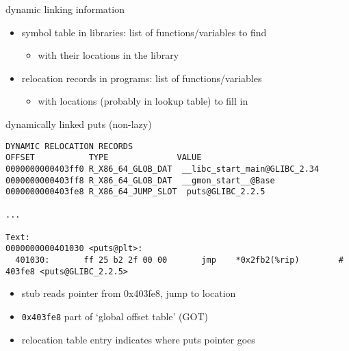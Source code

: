 \begin{frame}{dynamic linking information}
\begin{itemize}
\item symbol table in libraries: list of functions/variables to find
    \begin{itemize}
    \item with their locations in the library
    \end{itemize}
\item relocation records in programs: list of functions/variables
    \begin{itemize}
    \item with locations (probably in lookup table) to fill in
    \end{itemize}
\end{itemize}
\end{frame}


\begin{frame}[fragile,label=dynamicPuts]{dynamically linked puts (non-lazy)}
\begin{Verbatim}[commandchars=Q\{\},fontsize=\fontsize{9}{10}\selectfont]
DYNAMIC RELOCATION RECORDS
OFFSET           TYPE              VALUE 
0000000000403ff0 R_X86_64_GLOB_DAT  __libc_start_main@GLIBC_2.34
0000000000403ff8 R_X86_64_GLOB_DAT  __gmon_start__@Base
0000000000403fe8 R_X86_64_JUMP_SLOT  puts@GLIBC_2.2.5

...

Text:
0000000000401030 <puts@plt>:
  401030:       ff 25 b2 2f 00 00       jmp    *0x2fb2(%rip)        # 403fe8 <puts@GLIBC_2.2.5>
\end{Verbatim}
\begin{itemize}
    \item stub reads pointer from 0x403fe8, jump to location
    \item {\tt 0x403fe8} part of `global offset table' (GOT)
    \item relocation table entry indicates where puts pointer goes
\end{itemize}
\end{frame}

